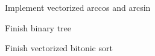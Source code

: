 
\begin{DoxyItemize}
\item Implement vectorized arccos and arcsin
\item Finish binary tree
\item Finish vectorized bitonic sort 
\end{DoxyItemize}